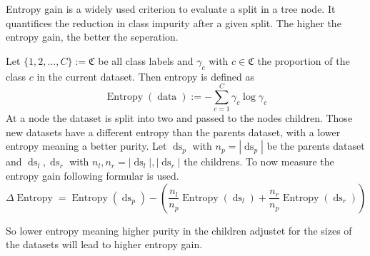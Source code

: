 Entropy gain is a widely used criterion to evaluate a split 
in a tree node. It quantifices the reduction in class impurity
after a given split. The higher the entropy gain, the better the 
seperation. 

Let $\{1, 2, ..., C\} := \mathfrak{C}$ be all class labels and 
$\gamma_c$ with $c \in \mathfrak{C}$ the proportion of the class $c$ in 
the current dataset. Then entropy is defined as 
\[
	\operatorname{Entropy}(\operatorname{data}) := - \sum_{c = 1}^{C} \gamma_c \log \gamma_c
\]
At a node the dataset is split into two and passed to the 
nodes children. Those new datasets have a different entropy than the 
parents dataset, with a lower entropy meaning a better purity. 
Let $\operatorname{ds}_{p}$ with $n_{p} = |\operatorname{ds}_p|$ be the parents dataset and $\operatorname{ds}_{l}, \operatorname{ds}_{r}$ with $n_{l}, n_{r} = |\operatorname{ds}_{l}|, |\operatorname{ds}_{r}|$ the childrens.
To now measure the entropy gain following formular is used.
\[
	\Delta \operatorname{Entropy} = \operatorname{Entropy}(\operatorname{ds}_p) - \left(\frac{n_{l}}{n_{p}}\operatorname{Entropy}(\operatorname{ds}_{l}) + \frac{n_{r}}{n_{p}} \operatorname{Entropy}(\operatorname{ds}_{r})\right)
\]
	

So lower entropy meaning higher purity in the children adjustet for the sizes of the datasets will lead to higher entropy gain.